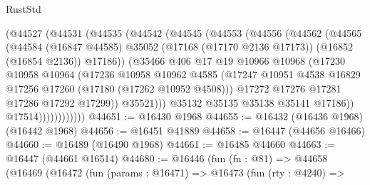 \begin{lexlean}{RustStd}
\begin{coremodule}
{\begin{coremodule}
{{{{{{{{{{{{{{{{{{{{{{{{{{{{{{{{{{{{{{{{{{{{{{{{{{{{{{{                    (@44527
                      (@44531
                        (@44535
                          (@44542
                            (@44545
                              (@44553
                                (@44556
                                  (@44562
                                    (@44565
                                      (@44584
                                        (@16847 @44585)
                                        @35052
                                        (@17168 (@17170 @2136 @17173))
                                        (@16852 (@16854 @2136))
                                        @17186))
                                    (@35466
                                      @406
                                      @17
                                      @19
                                      @10966
                                      @10968
                                      (@17230
                                        @10958
                                        @10964
                                        (@17236
                                          @10958
                                          @10962
                                          @4585
                                          (@17247
                                            @10951
                                            @4538
                                            @16829
                                            @17256
                                            @17260
                                            (@17180 (@17262 @10952 @4508)))
                                          @17272
                                          @17276
                                          @17281
                                          @17286
                                          @17292
                                          @17299))
                                      @35521)))
                                @35132
                                @35135
                                @35138
                                @35141
                                @17186))
                            @17514))))))))))))
@44651 := @16430 @1968
@44655 := @16432 (@16436 @1968) (@16442 @1968)
@44656 := @16451 @41889
@44658 := @16447 (@44656 @16466)
@44660 := @16489 (@16490 @1968)
@44661 := @16485 @44660
@44663 := @16447 (@44661 @16514)
@44680 := @16446
    (fun (fn : @81) =>
    @44658
      (@16469
        (@16472
          (fun (params : @16471) =>
          @16473
            (fun (rty : @4240) =>
}}}}}}}}}}}}}}}}}}}}}}}}}}}}}}}}}}}}}}}}}}}}}}}}}}}}}}}
\end{coremodule}}
\end{coremodule}
\end{lexlean}
